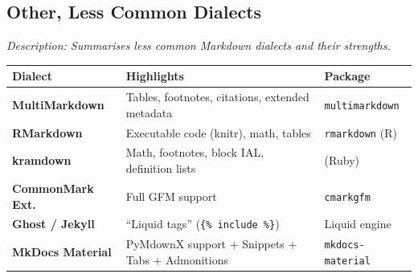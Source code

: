 \documentclass[a4paper,twoside]{article}
\begin{document}
\subsection{\textbf{Other, Less Common Dialects}}\label{textbf-other-less-common-dialects}

\emph{Description: Summarises less common Markdown dialects and their strengths.}

\begin{center}
\begin{tabularx}{\linewidth}{>{\raggedright\arraybackslash}X>{\raggedright\arraybackslash}X>{\raggedright\arraybackslash}X}
\toprule
\textbf{Dialect} & \textbf{Highlights} & \textbf{Package} \\

\midrule
\textbf{MultiMarkdown} & Tables, footnotes, citations, extended metadata & \texttt{multimarkdown} \\
\textbf{RMarkdown} & Executable code (knitr), math, tables & \texttt{rmarkdown} (R) \\
\textbf{kramdown} & Math, footnotes, block IAL, definition lists & (Ruby) \\
\textbf{CommonMark Ext.} & Full GFM support & \texttt{cmarkgfm} \\
\textbf{Ghost / Jekyll} & ``Liquid tags'' (\texttt{\{\% include \%\}}) & Liquid engine \\
\textbf{MkDocs Material} & PyMdownX support + Snippets + Tabs + Admonitions & \texttt{mkdocs-\allowbreak{}material} \\

\bottomrule
\end{tabularx}
\end{center}

\printglossary[type=\acronymtype]
\end{document}
